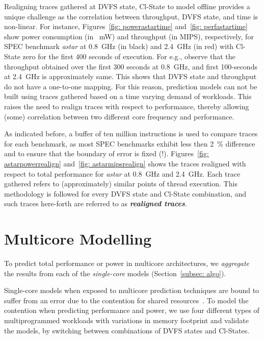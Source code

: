  Realigning traces gathered at DVFS state, Cl-State to model offline provides
a unique challenge as the correlation between throughput, DVFS state, and  time is
non-linear. For instance, Figures~\ref{fig: powerastartime} and~\ref{fig: perfastartime}
show power consumption (in \SI{}{\milli\watt}) and throughput (in MIPS), respectively, for
SPEC benchmark \emph{astar} at \SI{0.8}{\giga\hertz} (in black) and \SI{2.4}{\giga\hertz}
(in red) with Cl-State zero for the first 400 seconds of execution. For e.g., observe that
the throughput obtained over the first 300 seconds at \SI{0.8}{\giga\hertz}, and first
100-seconds at \SI{2.4}{\giga\hertz} is approximately same. This shows that DVFS state and
throughput do not have a one-to-one mapping.  For this reason, prediction models can not
be built using traces gathered based on a time varying demand of workloads.  This raises
the need to realign traces with respect to performance, thereby allowing (some)
correlation between two different core frequency and performance.

 As indicated before, a buffer of ten million instructions is used to compare
traces for each benchmark, as most SPEC benchmarks exhibit less then \SI{2}{\percent}
difference and to ensure that the boundary of error is fixed (!).  Figures~\ref{fig:
astarpowerrealign} and~\ref{fig: astarmipsrealign} shows the traces realigned with
respect to total performance for \emph{astar} at \SI{0.8}{\giga\hertz} and
\SI{2.4}{\giga\hertz}. Each trace gathered refers to (approximately) similar points of
thread execution. This methodology is followed for every DVFS state and Cl-State
combination, and such traces here-forth are referred to as \emph{\textbf{realigned
traces}}.

\section{Multicore Modelling}
\label{subsec: mult model}

To predict total performance or power in multicore architectures, we \textit{aggregate}
the results from each of the \textit{single-core} models (Section~\ref{subsec: algo}). 

Single-core models when exposed to multicore prediction techniques are bound to suffer
from an error due to the contention for shared
resources~\citep{Blagodurov:2010:CSM:1880018.1880019, Nishtala:2013:ETC:2555754.2555775,
Lefurgy:2008:PCP:1355774.1355779, McCullough:2011:EEM:2002181.2002193,6974701,
Becchi:2006:DTA:1128022.1128029, Gandhi:2010:OAE:1869138.1869264,
Brooks:2000:WFA:339647.339657, Gandhi:2009:OPA:1555349.1555368,6604487}.  
To model the contention when predicting performance and power, we use four different
types of multiprogrammed workloads with variations in memory footprint and validate the
models, by switching between combinations of DVFS states and Cl-States.   


